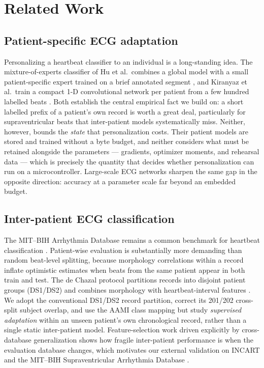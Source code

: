 \section{Related Work}
\label{sec:relatedwork}

\subsection{Patient-specific ECG adaptation}

Personalizing a heartbeat classifier to an individual is a long-standing idea.
The mixture-of-experts classifier of Hu et al.\ combines a global model with a
small patient-specific expert trained on a brief annotated segment
\cite{hu1997patient}, and Kiranyaz et al.\ train a compact 1-D convolutional
network per patient from a few hundred labelled beats \cite{kiranyaz2016realtime}.
Both establish the central empirical fact we build on: a short labelled prefix of
a patient's own record is worth a great deal, particularly for supraventricular
beats that inter-patient models systematically miss. Neither, however, bounds the
\emph{state} that personalization costs. Their patient models are stored and
trained without a byte budget, and neither considers what must be retained
alongside the parameters --- gradients, optimizer moments, and rehearsal data ---
which is precisely the quantity that decides whether personalization can run on a
microcontroller. Large-scale ECG networks \cite{hannun2019cardiologist} sharpen
the same gap in the opposite direction: accuracy at a parameter scale far beyond
an embedded budget.

\subsection{Inter-patient ECG classification}

The MIT--BIH Arrhythmia Database remains a common benchmark for heartbeat
classification \cite{moody2001impact,goldberger2000physiobank}. Patient-wise
evaluation is substantially more demanding than random beat-level splitting,
because morphology correlations within a record inflate optimistic estimates
when beats from the same patient appear in both train and test. The de Chazal
protocol partitions records into disjoint patient groups (DS1/DS2) and combines
morphology with heartbeat-interval features \cite{dechazal2004automatic}. We
adopt the conventional DS1/DS2 record partition, correct its 201/202 cross-split
subject overlap, and use the AAMI class mapping
\cite{ansi2012aami} but study \emph{supervised adaptation} within an unseen
patient's own chronological record, rather than a single static inter-patient
model. Feature-selection work driven explicitly by cross-database generalization
\cite{llamedo2011heartbeat,mar2011optimization} shows how fragile inter-patient
performance is when the evaluation database changes, which motivates our external
validation on INCART and the MIT--BIH Supraventricular Arrhythmia Database
\cite{greenwald1990svdb}.

